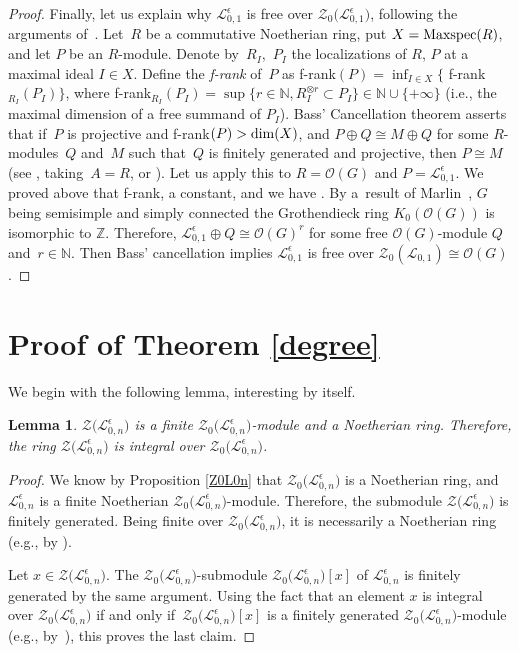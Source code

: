 \documentclass[10pt,a4paper]{amsart}
\numberwithin{equation}{section}
\newtheorem{lem}[teo]{Lemma}
\theoremstyle{definition}
\newcommand{\e}{\epsilon}
\newcommand{\mz}{\mathbb{Z}}
\newcommand{\mn}{\mathbb{N}}
\newcommand{\Ll}{{\mathcal L}}
\newcommand{\Oo}{{\mathcal O}}
\begin{document}
\begin{proof}
Finally, let us explain why $\Ll_{0,1}^\e$ is free over $\mathcal{Z}_0\bigl(\Ll_{0,1}^\e\bigr)$, following the arguments of~\cite{BGS}. Let~$R$ be a commutative Noetherian ring, put $X={\rm Maxspec}(R)$, and let $P$ be an $R$-module. Denote by~$R_I$,~$P_I$ the localizations of $R$, $P$ at a maximal ideal $I\in X$. Define the {\it f-rank} of~$P$ as f-rank$ (P) = \inf_{I\in X} \{$ f-rank${}_{R_I}(P_I)\}$, where f-rank${{}_{R_I}(P_I) = \sup\bigl\{ r\in \mathbb{N}, R_I^{\otimes r}\subset P_I\bigr\}\in \mn\cup\{+\infty\}}$ (i.e., the maximal dimension of a free summand of $P_I$). Bass' Cancellation theorem asserts that if~$P$ is projective and f-rank$(P)> {\rm dim}(X)$, and $P\oplus Q \cong M\oplus Q$ for some $R$-modules~$Q$ and~$M$ such that~$Q$ is finitely generated and projective, then $P\cong M$ (see \cite[Section~IV.3.5, p.~167 and~p.~170]{Bass}, taking~${A=R}$, or \cite[Section~11.7.13]{MC-R}). Let us apply this to ${R=\Oo(G)}$ and $P=\Ll_{0,1}^\e$. We proved above that f-rank, a constant, and we have . By a~result of Marlin~\cite{Marlin}, $G$ being semisimple and simply connected the Grothendieck ring $K_0(\Oo(G)\!)$ is isomorphic to $\mz$. Therefore, $\Ll_{0,1}^\e\oplus Q \cong \Oo(G)^r$ for some free $\Oo(G)$-module $Q$ and~${r\in \mathbb{N}}$. Then Bass' cancellation implies $\Ll_{0,1}^\e$ is free over $\mathcal{Z}_0(\Ll_{0,1})\cong \Oo(G)$.
\end{proof}

\section{Proof of Theorem \ref{degree}}\label{DEGREEsec}
We begin with the following lemma, interesting by itself.
\begin{lem}\label{ZfiniteZ0} $\mathcal{Z}\bigl(\Ll_{0,n}^\e\bigr)$ is a finite $\mathcal{Z}_0\bigl(\Ll_{0,n}^\e\bigr)$-module and a Noetherian ring. Therefore, the ring $\mathcal{Z}\bigl(\Ll_{0,n}^\e\bigr)$ is integral over $\mathcal{Z}_0\bigl(\Ll_{0,n}^\e\bigr)$.
\end{lem}
\begin{proof} We know by Proposition \ref{Z0L0n} that $\mathcal{Z}_0\bigl(\Ll_{0,n}^\e\bigr)$ is a Noetherian ring, and $\Ll_{0,n}^\e$ is a finite Noetherian $\mathcal{Z}_0\bigl(\Ll_{0,n}^\e\bigr)$-module. Therefore, the submodule $\mathcal{Z}\bigl(\Ll_{0,n}^\e\bigr)$ is finitely generated. Being finite over $\mathcal{Z}_0\bigl(\Ll_{0,n}^\e\bigr)$, it is necessarily a Noetherian ring (e.g., by \cite[Proposition~7.2]{AM}).

Let $x\in \mathcal{Z}\bigl(\Ll_{0,n}^\e\bigr)$. The $\mathcal{Z}_0\bigl(\Ll_{0,n}^\e\bigr)$-submodule $\mathcal{Z}_0\bigl(\Ll_{0,n}^\e\bigr)[x]$ of $\Ll_{0,n}^\e$ is finitely generated by the same argument. Using the fact that an element $x$ is integral over $\mathcal{Z}_0\bigl(\Ll_{0,n}^\e\bigr)$ if and only if~${\mathcal{Z}_0\bigl(\Ll_{0,n}^\e\bigr)[x]}$ is a finitely generated $\mathcal{Z}_0\bigl(\Ll_{0,n}^\e\bigr)$-module (e.g., by~\cite[Proposition 5.1]{AM}), this proves the last claim.
\end{proof}
\end{document}
